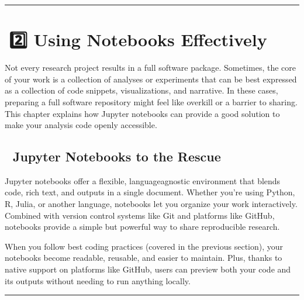 \documentclass[letterpaper,10pt,english]{jupyterBook}
\let\sphinxpxdimen\pdfpxdimen\else\newdimen\sphinxpxdimen
\begin{document}
\bigskip\hrule\bigskip


\sphinxstepscope


\section{📘2️⃣ Using Notebooks Effectively}
\label{\detokenize{chapters/02/02b_jupyter-notebooks:using-notebooks-effectively}}\label{\detokenize{chapters/02/02b_jupyter-notebooks::doc}}
\sphinxAtStartPar
Not every research project results in a full software package. Sometimes, the core of your work is a collection of analyses or experiments that can be best expressed as a collection of code snippets, visualizations, and narrative. In these cases, preparing a full software repository might feel like overkill or a barrier to sharing. This chapter explains how Jupyter notebooks can provide a good solution to make your analysis code openly accessible.


\subsection{🚀 Jupyter Notebooks to the Rescue}
\label{\detokenize{chapters/02/02b_jupyter-notebooks:jupyter-notebooks-to-the-rescue}}
\noindent{\hspace*{\fill}\sphinxincludegraphics[width=200\sphinxpxdimen]{{jupyter-logo}.png}}

\sphinxAtStartPar
Jupyter notebooks offer a flexible, language\sphinxhyphen{}agnostic environment that blends code, rich text, and outputs in a single document. Whether you’re using Python, R, Julia, or another language, notebooks let you organize your work interactively. Combined with version control systems like Git and platforms like GitHub, notebooks provide a simple but powerful way to share reproducible research.

\sphinxAtStartPar
When you follow best coding practices (covered in the previous section), your notebooks become readable, reusable, and easier to maintain. Plus, thanks to native support on platforms like GitHub, users can preview both your code and its outputs without needing to run anything locally.


\bigskip\hrule\bigskip
\end{document}
